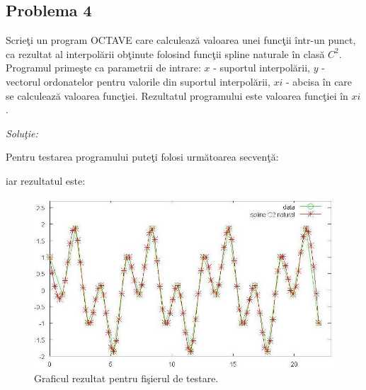 \documentclass{exam}
\newcommand{\octavescript}[2]{
	
}
\begin{document}

\subsection{Problema 4}

Scrieţi un program OCTAVE care calculează valoarea unei funcţii într-un punct, ca rezultat al interpolării obţinute folosind funcţii spline naturale în clasă $C^2$. Programul primeşte ca parametrii de intrare: $x$ - suportul interpolării, $y$ - vectorul ordonatelor pentru valorile din suportul interpolării, $xi$ - abcisa în care se calculează valoarea funcţiei. Rezultatul programului este valoarea funcţiei în $xi$.

\textit{Soluţie:}

\octavescript{./src/SplineC2natural.m}{Interpolare cu funcţii spline naturale în clasă $C^2$.}

Pentru testarea programului puteţi folosi următoarea secvenţă:

\octavescript{./src/testsplineC2natural.m}{Fişier de testare.}

iar rezultatul este:

\begin{figure}[ht]
	\centering
	\includegraphics[width=165mm]{./img/splineC2natural.jpg}
	\caption{Graficul rezultat pentru fişierul de testare.}
	\label{bezi}
\end{figure}

\end{document}
